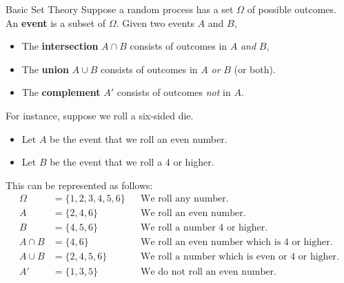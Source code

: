 \documentclass[xcolor=table]{beamer}
\renewcommand{\emph}{\textbf}
\begin{document}
\begin{frame}{Basic Set Theory}
Suppose a random process has a set $\Omega$ of possible outcomes. \\An \emph{event} is a subset of $\Omega$. Given two events $A$ and $B$, 
\begin{itemize}
\item The \emph{intersection} $A\cap B$ consists of outcomes in $A$ \textit{and} $B$, \item The \emph{union} $A\cup B$ consists of outcomes in $A$ \textit{or} $B$ (or both). 
\item The \emph{complement} $A'$ consists of outcomes \textit{not} in $A$. 
\end{itemize}

\pause
For instance, suppose we roll a six-sided die. 
\begin{itemize}
\item Let $A$ be the event that we roll an even number. 
\item Let $B$ be the event that we roll a 4 or higher.
\end{itemize}
\pause
This can be represented as follows:
\begin{align*}
\Omega &= \{1,2,3,4,5,6\} && \text{We roll any number.}\\
A &= \{2,4,6\}&& \text{We roll an even number.}\\
B &= \{4,5,6\}&& \text{We roll a number 4 or higher.}\\
A \cap B &= \{4,6\} &&\text{We roll an even number which is 4 or higher.}\\
A \cup B &= \{2,4,5,6\} &&\text{We roll a number which is even or 4 or higher.}\\
A' &= \{1,3,5\} && \text{We do not roll an even number.}
\end{align*}
\end{frame}
\end{document}
